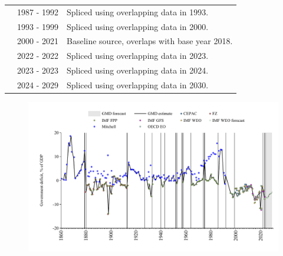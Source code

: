 \documentclass[12pt,a4paper,landscape]{article}
\begin{document}
\begin{adjustbox}{max totalsize={\paperwidth}{\paperheight},center}
\begin{minipage}[t][\textheight][t]{\textwidth}
\begin{table}[H]
\begin{tabular}{|l|l|l|}
\rowcolor{lightgray}\cite{Mitchell}& 1987 - 1992 &Spliced using overlapping data in 1993. \\
\rowcolor{white}\cite{IMF_FPP}& 1993 - 1999 &Spliced using overlapping data in 2000. \\
\rowcolor{lightgray}\cite{OECD_EO}& 2000 - 2021 &Baseline source, overlaps with base year 2018. \\
\rowcolor{white}\cite{IMF_WEO}& 2022 - 2022 &Spliced using overlapping data in 2023. \\
\rowcolor{lightgray}\cite{IMF_GFS}& 2023 - 2023 &Spliced using overlapping data in 2024. \\
\rowcolor{white}\cite{IMF_WEO_forecast}& 2024 - 2029 &Spliced using overlapping data in 2030. \\
\hline
\end{tabular}
\end{table}
\begin{figure}[H]
\centering
\includegraphics[width=\textwidth,height=0.6\textheight,keepaspectratio]{graphs/BRA_govdef_GDP.pdf}
\end{figure}
\end{minipage}
\end{adjustbox}
\end{document}
